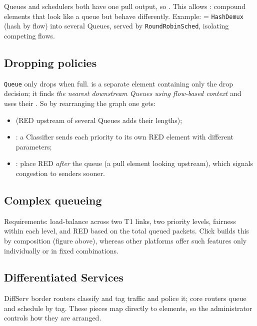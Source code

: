 Queues and schedulers both have one pull output, so . This allows : compound elements that look like a queue but behave differently. Example:  = \texttt{HashDemux} (hash by flow) into several Queues, served by \texttt{RoundRobinSched}, isolating competing flows.

\subsection{Dropping policies}
\texttt{Queue} only drops when full.  is a separate element containing only the drop decision; it finds \emph{the nearest downstream Queues using flow-based context} and uses their . So by rearranging the graph one gets:
\begin{itemize}
\item {} (RED upstream of several Queues adds their lengths);
\item {}: a Classifier sends each priority to its own RED element with different parameters;
\item {}: place RED \emph{after} the queue (a pull element looking upstream), which signals congestion to senders sooner.
\end{itemize}

\subsection{Complex queueing}
Requirements: load-balance across two T1 links, two priority levels, fairness within each level, and RED based on the total queued packets. Click builds this by composition (figure above), whereas other platforms offer such features only individually or in fixed combinations.

\subsection{Differentiated Services}
DiffServ border routers classify and tag traffic and police it; core routers queue and schedule by tag. These pieces map directly to elements, so the administrator controls how they are arranged.


